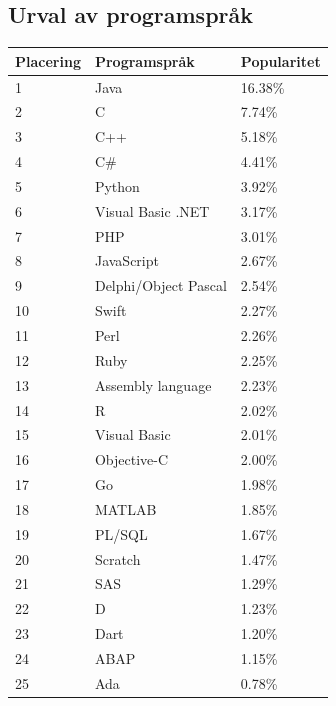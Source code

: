 \documentclass[12pt,swedish]{article}
\begin{document}
\clearpage
\begin{appendices}


\section{Urval av programspråk}\label{appendix:languages}
\begin{table}[H]
\centering
\label{appendix:table:languages}
\begin{tabular}{lll}
\toprule
Placering & Programspråk         & Popularitet \\ \midrule
1         & Java                 & 16.38\%     \\
2         & C                    & 7.74\%      \\
3         & C++                  & 5.18\%      \\
4         & C\#                  & 4.41\%      \\
5         & Python               & 3.92\%      \\
6         & Visual Basic .NET    & 3.17\%      \\
7         & PHP                  & 3.01\%      \\
8         & JavaScript           & 2.67\%      \\
9         & Delphi/Object Pascal & 2.54\%      \\
10        & Swift                & 2.27\%      \\
11        & Perl                 & 2.26\%      \\
12        & Ruby                 & 2.25\%      \\
13        & Assembly language    & 2.23\%      \\
14        & R                    & 2.02\%      \\
15        & Visual Basic         & 2.01\%      \\
16        & Objective-C          & 2.00\%      \\
17        & Go                   & 1.98\%      \\
18        & MATLAB               & 1.85\%      \\
19        & PL/SQL               & 1.67\%      \\
20        & Scratch              & 1.47\%      \\
21        & SAS                  & 1.29\%      \\
22        & D                    & 1.23\%      \\
23        & Dart                 & 1.20\%      \\
24        & ABAP                 & 1.15\%      \\
25        & Ada                  & 0.78\%      \\ \bottomrule
\end{tabular}
\end{table}


\end{appendices}
\end{document}
